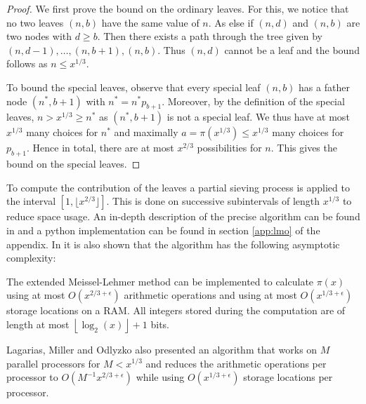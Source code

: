 \begin{proof}
	We first prove the bound on the ordinary leaves. For this, we notice that no two leaves $(n,b)$ have the same value of $n$.
	As else if $(n,d)$ and $(n,b)$ are two nodes with $d \geq b$. Then there exists a path through the tree
	given by $(n,d-1), \ldots, (n,b+1), (n,b)$. Thus $(n,d)$ cannot be a leaf and the bound follows as $n \leq x^{1 /3}$.

	To bound the special leaves, observe that every special leaf $(n,b)$ has a father node $(n^{*},b+1)$ with
	$n^{*} = n^{*} p_{b+1}$.
	Moreover, by the definition of the special leaves, $n > x^{1 /3} \geq n^{*}$ as $(n^{*},b+1)$ is not a special leaf.
	We thus have at most $x^{1 /3}$ many choices for $n^{*}$ and maximally $a = \pi(x^{1 / 3}) \leq x^{1/3}$ many choices for $p_{b+1}$.
	Hence in total, there are at most $x^{2 / 3}$ possibilities for $n$. This gives the bound on the special leaves.
\end{proof}

To compute the contribution of the leaves a partial sieving process is applied to the interval $[1,\lfloor x^{2 / 3} \rfloor]$.
This is done on successive subintervals of length $x^{1 / 3}$ to reduce space usage.
An in-depth description of the precise algorithm  can be found in \cite{lagarias85} and a python
implementation can be found in section \ref{app:lmo} of the appendix.
In \cite{lagarias85} it is also shown that the algorithm has the following asymptotic complexity:
\begin{theorem}
	The extended Meissel-Lehmer method can be implemented to calculate $\pi(x)$ using at most $O(x^{2 /3 + \epsilon})$ arithmetic
	operations and using at most $O(x^{1 / 3 + \epsilon})$ storage locations on a RAM.
	All integers stored during the computation are of length at most $\left\lfloor \log_2(x)  \right\rfloor + 1$ bits.
\end{theorem}

\begin{remark}
	Lagarias, Miller and Odlyzko also presented an algorithm that works on $M$ parallel processors for $M < x^{1 /3}$ and reduces the
	arithmetic operations per processor to $O(M^{-1} x^{2 / 3 + \epsilon})$ while using $O(x^{1 /3 + \epsilon})$ storage locations per processor.
\end{remark}

